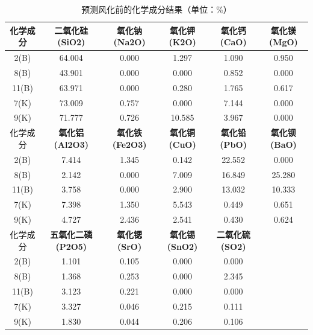 \documentclass{my_paper}
\begin{document}
\begin{longtable}{c|ccccc}
  \caption{预测风化前的化学成分结果（单位：$\%$）}
  \label{jieguo1}\\\toprule
  化学成分                 & \multicolumn{1}{c}{\textbf{二氧化硅(SiO2)}}  & \multicolumn{1}{c}{\textbf{氧化钠(Na2O)}}  & \multicolumn{1}{c}{\textbf{氧化钾(K2O)}}  & \multicolumn{1}{c}{\textbf{氧化钙(CaO)}}  & \multicolumn{1}{c}{\textbf{氧化镁(MgO)}} \\\midrule
  2(B)  & 64.004 & 0.000 & 1.297  & 1.090  & 0.950  \\
  8(B)  & 43.901 & 0.000 & 0.000  & 0.852  & 0.000  \\
  11(B) & 63.971 & 0.000 & 0.280  & 1.765  & 0.617  \\
  7(K)  & 73.009 & 0.757 & 0.000  & 7.144  & 0.000  \\
  9(K)  & 71.777 & 0.726 & 10.585 & 3.967  & 0.000  \\\midrule
化学成分                 & \multicolumn{1}{c}{\textbf{氧化铝(Al2O3)}}  & \multicolumn{1}{c}{\textbf{氧化铁(Fe2O3)}} & \multicolumn{1}{c}{\textbf{氧化铜(CuO)}}  & \multicolumn{1}{c}{\textbf{氧化铅(PbO)}}  & \multicolumn{1}{c}{\textbf{氧化钡(BaO)}} \\\midrule
2(B)  & 7.414  & 1.345 & 0.142  & 22.552 & 0.000  \\
8(B)  & 2.142  & 0.000 & 7.009  & 16.849 & 25.280 \\
11(B) & 3.758  & 0.000 & 2.900  & 13.032 & 10.333 \\
7(K)  & 7.398  & 1.350 & 5.543  & 0.449  & 0.651  \\
9(K)  & 4.727  & 2.436 & 2.541  & 0.430  & 0.624  \\\midrule
化学成分                 & \multicolumn{1}{c}{\textbf{五氧化二磷(P2O5)}} & \multicolumn{1}{c}{\textbf{氧化锶(SrO)}}   & \multicolumn{1}{c}{\textbf{氧化锡(SnO2)}} & \multicolumn{1}{c}{\textbf{二氧化硫(SO2)}} &                                       \\\midrule
2(B)  & 1.101  & 0.105 & 0.000  & 0.000  &        \\
8(B)  & 1.368  & 0.253 & 0.000  & 2.345  &        \\
11(B) & 3.123  & 0.221 & 0.000  & 0.000  &        \\
7(K)  & 3.327  & 0.046 & 0.215  & 0.111  &        \\
9(K)  & 1.830  & 0.044 & 0.206  & 0.106  &        \\\bottomrule
\end{longtable}
\end{document}
